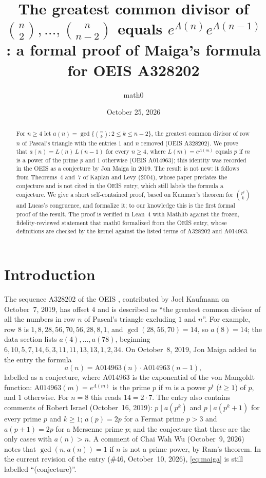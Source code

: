 \documentclass[11pt]{amsart}
\title[The gcd of truncated rows of Pascal's triangle (OEIS A328202)]{The greatest common divisor of $\binom{n}{2},\dots,\binom{n}{n-2}$ equals $e^{\Lambda(n)}e^{\Lambda(n-1)}$: a formal proof of Maiga's formula for OEIS A328202}
\author{math0}
\date{October 25, 2026}
\theoremstyle{plain}
\theoremstyle{definition}
\begin{document}
\begin{abstract}
For $n\ge4$ let $a(n)=\gcd\{\binom nk:2\le k\le n-2\}$, the greatest common divisor of row $n$ of Pascal's triangle with the entries $1$ and $n$ removed (OEIS A328202).
We prove that $a(n)=L(n)\,L(n-1)$ for every $n\ge4$, where $L(m)=e^{\Lambda(m)}$ equals $p$ if $m$ is a power of the prime $p$ and $1$ otherwise (OEIS A014963); this identity was recorded in the OEIS as a conjecture by Jon Maiga in 2019.
The result is not new: it follows from Theorems~4 and~7 of Kaplan and Levy (2004), whose paper predates the conjecture and is not cited in the OEIS entry, which still labels the formula a conjecture. We give a short self-contained proof, based on Kummer's theorem for $\binom{p^t}{k}$ and Lucas's congruence, and formalize it; to our knowledge this is the first formal proof of the result.
The proof is verified in Lean~4 with Mathlib against the frozen, fidelity-reviewed statement that math0 formalized from the OEIS entry, whose definitions are checked by the kernel against the listed terms of A328202 and A014963.
\end{abstract}
\maketitle

\section{Introduction}

The sequence A328202 of the OEIS \cite{A328202}, contributed by Joel Kaufmann on October~7, 2019, has offset $4$ and is described as ``the greatest common divisor of all the numbers in row $n$ of Pascal's triangle excluding $1$ and $n$''. For example, row $8$ is $1,8,28,56,70,56,28,8,1$, and $\gcd(28,56,70)=14$, so $a(8)=14$; the data section lists $a(4),\dots,a(78)$, beginning $6,10,5,7,14,6,3,11,11,13,13,1,2,34$.
On October~8, 2019, Jon Maiga added to the entry the formula
\begin{equation}\label{eq:maiga}
  a(n)=\mathrm{A014963}(n)\cdot\mathrm{A014963}(n-1),
\end{equation}
labelled as a conjecture, where A014963 \cite{A014963} is the exponential of the von Mangoldt function: $\mathrm{A014963}(m)=e^{\Lambda(m)}$ is the prime $p$ if $m$ is a power $p^t$ ($t\ge1$) of $p$, and $1$ otherwise. For $n=8$ this reads $14=2\cdot 7$.
The entry also contains comments of Robert Israel (October~16, 2019): $p\mid a(p^k)$ and $p\mid a(p^k+1)$ for every prime $p$ and $k\ge1$; $a(p)=2p$ for a Fermat prime $p>3$ and $a(p+1)=2p$ for a Mersenne prime $p$; and the conjecture that these are the only cases with $a(n)>n$. A comment of Chai Wah Wu (October~9, 2026) notes that $\gcd(n,a(n))=1$ if $n$ is not a prime power, by Ram's theorem. In the current revision of the entry (\#46, October~10, 2026), \eqref{eq:maiga} is still labelled ``(conjecture)''.
\end{document}
